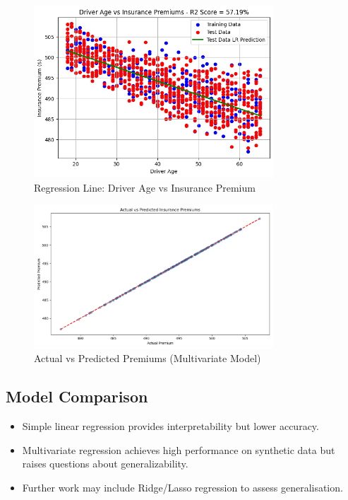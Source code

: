 \documentclass{article}
\begin{document}
\begin{figure}[h]
\centering
\includegraphics[width=0.8\textwidth]{age_insurance_LR.png}
\caption{Regression Line: Driver Age vs Insurance Premium}\label{fig:regression_age}
\end{figure}

\begin{figure}[h]
\centering
\includegraphics[width=0.8\textwidth]{actual_vs_predicted.png}
\caption{Actual vs Predicted Premiums (Multivariate Model)}\label{fig:multivariate_regression}
\end{figure}

\subsection{Model Comparison}

\begin{itemize}
\item Simple linear regression provides interpretability but lower accuracy.
\item Multivariate regression achieves high performance on synthetic data but raises questions about generalizability.
\item Further work may include Ridge/Lasso regression to assess generalisation.
\end{itemize}
\end{document}
